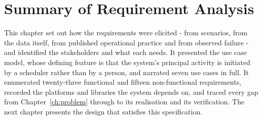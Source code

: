 \section{Summary of Requirement Analysis}
This chapter set out how the requirements were elicited - from scenarios, from
the data itself, from published operational practice and from observed failure -
and identified the stakeholders and what each needs. It presented the use case
model, whose defining feature is that the system's principal activity is
initiated by a scheduler rather than by a person, and narrated seven use cases in
full. It enumerated twenty-three functional and fifteen non-functional
requirements, recorded the platforms and libraries the system depends on, and
traced every gap from Chapter~\ref{ch:problem} through to its realisation and its
verification. The next chapter presents the design that satisfies this
specification.

